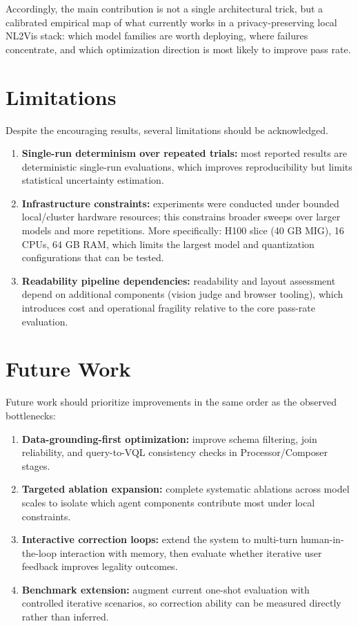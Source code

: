 \documentclass[a4paper,oneside,bibliography=totoc]{scrbook}
\begin{document}
Accordingly, the main contribution is not a single architectural trick, but a calibrated empirical map of what currently works in a privacy-preserving local NL2Vis stack: which model families are worth deploying, where failures concentrate, and which optimization direction is most likely to improve pass rate.

\section{Limitations}
\label{sec:limitations}
Despite the encouraging results, several limitations should be acknowledged.
\begin{enumerate}
  \item \textbf{Single-run determinism over repeated trials:} most reported results are deterministic single-run evaluations, which improves reproducibility but limits statistical uncertainty estimation.
  \item \textbf{Infrastructure constraints:} experiments were conducted under bounded local/cluster hardware resources; this constrains broader sweeps over larger models and more repetitions. More specifically: H100 slice (40 GB MIG), 16 CPUs, 64 GB RAM, which limits the largest model and quantization configurations that can be tested.
  \item \textbf{Readability pipeline dependencies:} readability and layout assessment depend on additional components (vision judge and browser tooling), which introduces cost and operational fragility relative to the core pass-rate evaluation.
\end{enumerate}

\section{Future Work}
\label{sec:future_work}
Future work should prioritize improvements in the same order as the observed bottlenecks:
\begin{enumerate}
  \item \textbf{Data-grounding-first optimization:} improve schema filtering, join reliability, and query-to-VQL consistency checks in Processor/Composer stages.
  \item \textbf{Targeted ablation expansion:} complete systematic ablations across model scales to isolate which agent components contribute most under local constraints.
  \item \textbf{Interactive correction loops:} extend the system to multi-turn human-in-the-loop interaction with memory, then evaluate whether iterative user feedback improves legality outcomes.
  \item \textbf{Benchmark extension:} augment current one-shot evaluation with controlled iterative scenarios, so correction ability can be measured directly rather than inferred.
\end{enumerate}
\end{document}
